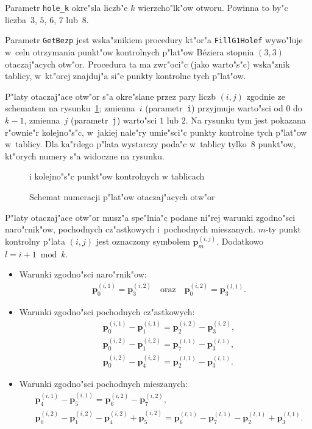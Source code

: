 Parametr \texttt{hole\_k} okre"sla liczb"e $k$ wierzcho"lk"ow otworu.
Powinna to by"c liczba~$3$, $5$, $6$, $7$ lub~$8$.

Parametr \texttt{GetBezp} jest wska"znikiem procedury kt"or"a
\texttt{FillG1Holef} wywo"luje w~celu otrzymania punkt"ow kontrolnych
p"lat"ow B\'{e}ziera stopnia $(3,3)$ otaczaj"acych otw"or. Procedura ta ma
zwr"oci"c (jako warto"s"c) wska"znik tablicy, w~kt"orej znajduj"a si"e
punkty kontrolne tych p"lat"ow.

P"laty otaczaj"ace otw"or s"a okre"slane przez pary liczb $(i,j)$ zgodnie ze
schematem na rysunku~\ref{fig:g1:patch:num:1}; zmienna~$i$
(parametr~\texttt{i}) przyjmuje warto"sci od $0$ do $k-1$, zmienna~$j$
(parametr~\texttt{j}) warto"sci $1$ lub $2$.
Na rysunku tym jest pokazana r"ownie"r kolejno"s"c, w~jakiej nale"ry
umie"sci"c punkty kontrolne tych p"lat"ow w~tablicy.
Dla ka"rdego p"lata wystarczy poda"c w~tablicy tylko~$8$ punkt"ow,
kt"orych numery s"a widoczne na rysunku.
\begin{figure}[ht]
  \centerline{}
  \caption{\label{fig:g1:patch:num:1}Schemat numeracji p"lat"ow
    otaczaj"acych otw"or}
  \centerline{i kolejno"s"c punkt"ow kontrolnych w tablicach}
\end{figure}

P"laty otaczaj"ace otw"or musz"a spe"lnia"c podane ni"rej warunki
zgodno"sci naro"rnik"ow, pochodnych cz"astkowych i~pochodnych mieszanych.
$m$-ty punkt kontrolny p"lata $(i,j)$ jest oznaczony symbolem
$\bm{p}^{(i,j)}_m$. Dodatkowo $l=i+1\bmod k$.
\begin{itemize}
  \item Warunki zgodno"sci naro"rnik"ow:
    \begin{align*}
      &{}\bm{p}^{(i,1)}_0=\bm{p}^{(i,2)}_3 \quad\mbox{oraz}\quad
      \bm{p}^{(i,2)}_0=\bm{p}^{(l,1)}_3.
    \end{align*}
  \item Warunki zgodno"sci pochodnych cz"astkowych:
    \begin{align*}
      &{}\bm{p}^{(i,1)}_0-\bm{p}^{(i,1)}_1=\bm{p}^{(i,2)}_2-\bm{p}^{(i,2)}_3, \\
      &{}\bm{p}^{(i,2)}_0-\bm{p}^{(i,2)}_1=\bm{p}^{(l,1)}_7-\bm{p}^{(l,1)}_3, \\
      &{}\bm{p}^{(i,2)}_0-\bm{p}^{(i,2)}_4=\bm{p}^{(l,1)}_2-\bm{p}^{(l,1)}_3.
    \end{align*}
  \item Warunki zgodno"sci pochodnych mieszanych:
    \begin{align*}
      &{}\bm{p}^{(i,1)}_4-\bm{p}^{(i,1)}_5=\bm{p}^{(i,2)}_6-\bm{p}^{(i,2)}_7, \\
      &{}\bm{p}^{(i,2)}_0-\bm{p}^{(i,2)}_1-\bm{p}^{(i,2)}_4+\bm{p}^{(i,2)}_5=
      \bm{p}^{(l,1)}_6-\bm{p}^{(l,1)}_7-\bm{p}^{(l,1)}_2+\bm{p}^{(l,1)}_3.
    \end{align*}
\end{itemize}

